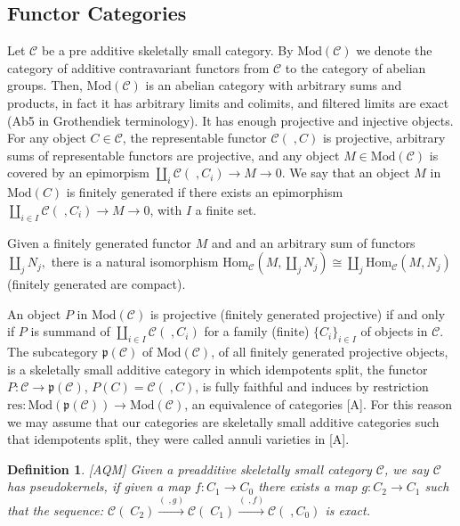 \documentclass{amsart}
\theoremstyle{plain}
\newtheorem{definition}{Definition}
\numberwithin{equation}{section}
\begin{document}
\subsection{Functor Categories}

Let $\mathcal{C}$ be a pre additive skeletally small category. By $\mathrm{Mod}(\mathcal{C})$ we denote the category of additive contravariant functors
from $\mathcal{C}$ to the category of abelian groups. Then, $\mathrm{Mod}(\mathcal{C})$ is an abelian category with arbitrary sums and products, in
fact it has arbitrary limits and colimits, and filtered limits are exact
(Ab5 in Grothendiek terminology). It has enough projective and injective
objects. For any object $C\in \mathcal{C}$, the representable functor $\mathcal{C}(\;,C)$ is projective, arbitrary sums of representable functors
are projective, and any object $M\in \mathrm{Mod}(\mathcal{C})$ is covered
by an epimorpism $\coprod_{i}\mathcal{C}(\;,C_{i})\rightarrow M\rightarrow 0$. We say that an object $M$ in $\mathrm{Mod}(C)$ is finitely generated if
there exists an epimorphism $\coprod_{i\in I}\mathcal{C}(\;,C_{i})\rightarrow M\rightarrow 0$, with $I$ a finite set.

Given a finitely generated functor $M$ and and an arbitrary sum of functors $\coprod_{j}N_{j},$ there is a natural isomorphism $\mathrm{Hom}_{\mathcal{C}}(M,\coprod_{j}N_{j})\cong \coprod_{j}\mathrm{Hom}_{\mathcal{C}}(M,N_{j})$
(finitely generated are compact).

An object $P$ in $\mathrm{Mod}(\mathcal{C})$ is projective (finitely
generated projective) if and only if $P$ is summand of $\coprod_{i\in I}\mathcal{C}(\;,C_{i})$ for a family (finite) $\{C_{i}\}_{i\in I}$ of objects
in $\mathcal{C}$. The subcategory $\mathfrak{p}(\mathcal{C})$ of $\mathrm{Mod}(\mathcal{C})$, of all finitely generated projective objects, is a
skeletally small additive category in which idempotents split, the functor $P:\mathcal{C}\rightarrow \mathfrak{p}(\mathcal{C})$, $P(C)=\mathcal{C}(\;,C)$, is fully faithful and induces by restriction $\mathrm{res}:\mathrm{Mod}(\mathfrak{p}(\mathcal{C}))\rightarrow \mathrm{Mod}(\mathcal{C})$, an
equivalence of categories [A]. For this reason we may assume that our
categories are skeletally small additive categories such that idempotents
split, they were called annuli varieties in [A].

\begin{definition}
\emph{[AQM] } Given a preadditive skeletally small category $\mathcal{C}$, we
say $\mathcal{C}$ has pseudokernels, if given a map $f:C_{1}\rightarrow
C_{0} $ there exists a map $g:C_{2}\rightarrow C_{1}$ such that the
sequence: $\mathcal{C}(\;C_{2})\overset{(\;,g)}{\rightarrow }\mathcal{C}(\;C_{1})\overset{(\;,f)}{\rightarrow }\mathcal{C}(\;,C_{0})$ is exact.
\end{definition}
\end{document}
